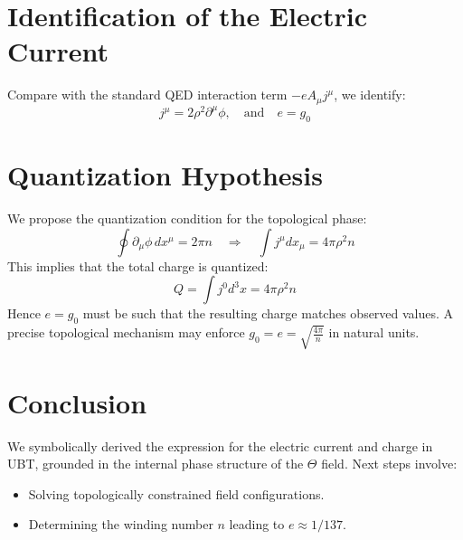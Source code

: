 \documentclass[12pt,a4paper]{article}
\begin{document}
\section{Identification of the Electric Current}

Compare with the standard QED interaction term $-e A_\mu j^\mu$, we identify:
\begin{equation}
    j^\mu = 2 \rho^2 \partial^\mu \phi, \quad \text{and} \quad e = g_0
\end{equation}

\section{Quantization Hypothesis}

We propose the quantization condition for the topological phase:
\begin{equation}
    \oint \partial_\mu \phi \, dx^\mu = 2\pi n \quad \Rightarrow \quad \int j^\mu dx_\mu = 4\pi \rho^2 n
\end{equation}
This implies that the total charge is quantized:
\begin{equation}
    Q = \int j^0 d^3x = 4\pi \rho^2 n
\end{equation}
Hence $e = g_0$ must be such that the resulting charge matches observed values. A precise topological mechanism may enforce $g_0 = e = \sqrt{\frac{4\pi}{n}}$ in natural units.

\section{Conclusion}

We symbolically derived the expression for the electric current and charge in UBT, grounded in the internal phase structure of the $\Theta$ field. Next steps involve:
\begin{itemize}
    \item Solving topologically constrained field configurations.
    \item Determining the winding number $n$ leading to $e \approx 1/137$.
\end{itemize}
\end{document}
